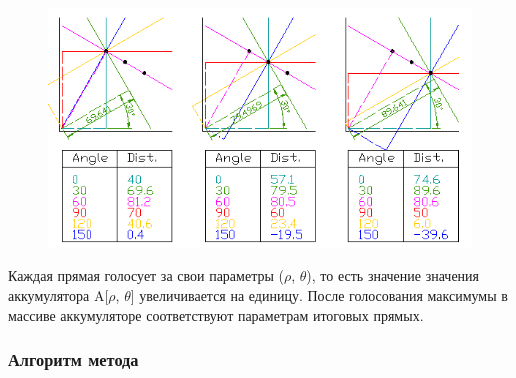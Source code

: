 \begin{figure}[h!]
	\centering
	\includegraphics[width=0.7\linewidth]{pictures/hough1}
	\caption[Алгоритм Хафа]{}
	\label{fig:hough1}
\end{figure}

Каждая прямая голосует за свои параметры ($\rho$, $\theta$), то есть значение значения аккумулятора A[$\rho$, $\theta$] увеличивается на единицу. 
После голосования максимумы в массиве аккумуляторе соответствуют параметрам итоговых прямых. 

\subsubsection{Алгоритм метода}
